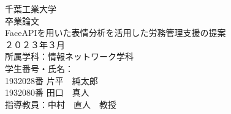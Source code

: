 \documentclass[12pt]{ltjsreport}%
\begin{document}
\begin{titlepage}
  \begin{center}
  \vspace*{50truept}
  {\Huge 千葉工業大学}\\
  \vspace{20truept}
  {\Huge 卒業論文}\\
  \vspace{170truept}
  {\Huge FaceAPIを用いた表情分析を活用した労務管理支援の提案} \\
  \vspace{30truept}
  {\Large ２０２３年３月}\\
  \vspace{150truept}
  {\Large 所属学科：情報ネットワーク学科}\\
  \vspace{10truept}
  {\Large 学生番号・氏名：}\\
  \vspace{10truept}
  {\Large 1932028番 片平　純太郎}\\
  {\Large 1932080番 田口　真人}\\
  \vspace{25truept}
  {\Large 指導教員：中村　直人　教授}
  \end{center}
  \end{titlepage}

\tableofcontents                 %
\listoffigures				 %
\listoftables				 %

\baselineskip 20pt               %


\clearpage
{}


%










\newpage

\end{document}
